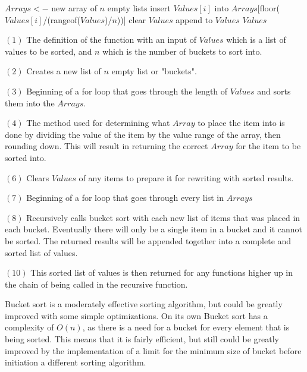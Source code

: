 \documentclass{article}
\begin{document}
\begin{algorithmic}
\State $Arrays<-$ new array of $n$ empty lists
\State insert $Values[i]$ into $Arrays[$floor($Values[i]$/(rangeof($Values$)/$n$))$]$
\EndFor
\State clear $Values$
\State append  to $Values$
\EndFor
\State \Return $Values$
\EndFunction
\end{algorithmic}
\begin{multicols}{2}
$(1)$ The definition of the function with an input of $Values$ which is a list of values to be sorted, and $n$ which is the number of buckets to sort into.

$(2)$ Creates a new list of $n$ empty list or "buckets".

$(3)$ Beginning of a for loop that goes through the length of $Values$ and sorts them into the $Arrays$.

$(4)$  The method used for determining what $Array$ to place the item into is done by dividing the value of the item by the value range of the array, then rounding down. This will result in returning the correct $Array$ for the item to be sorted into.

$(6)$ Clears $Values$ of any items to prepare it for rewriting with sorted results.

$(7)$ Beginning of a for loop that goes through every list in $Arrays$

$(8)$ Recursively calls bucket sort with each new list of items that was placed in each bucket. Eventually there will only be a single item in a bucket and it cannot be sorted. The returned results will be appended together into a complete and sorted list of values.

$(10)$ This sorted list of values is then returned for any functions higher up in the chain of being called in the recursive function.
\end{multicols}
\begin{multicols}{2}
Bucket sort is a moderately effective sorting algorithm, but could be greatly improved with some simple optimizations. On its own Bucket sort has a complexity of $O(n)$, as there is a need for a bucket for every element that is being sorted. This means that it is fairly efficient, but still could be greatly improved by the implementation of a limit for the minimum size of bucket before initiation a different sorting algorithm.
\end{multicols}
\end{document}
